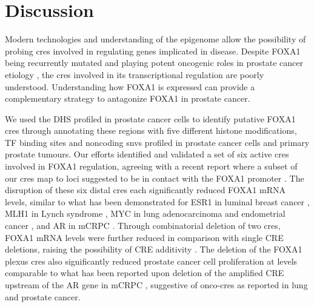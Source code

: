 \section{Discussion}

Modern technologies and understanding of the epigenome allow the possibility of probing \glspl{cre} involved in regulating genes implicated in disease.
Despite FOXA1 being recurrently mutated \cite{abeshouseMolecularTaxonomyPrimary2015,fraserGenomicHallmarksLocalized2017,barbieriExomeSequencingIdentifies2012,grassoMutationalLandscapeLethal2012,robinsonIntegrativeClinicalGenomics2015} and playing potent oncogenic roles in prostate cancer etiology \cite{paroliaDistinctStructuralClasses2019,adamsFOXA1MutationsAlter2019,gaoForkheadDomainMutations2019}, the \glspl{cre} involved in its transcriptional regulation are poorly understood.
Understanding how FOXA1 is expressed can provide a complementary strategy to antagonize FOXA1 in prostate cancer.

We used the DHS profiled in prostate cancer cells to identify putative FOXA1 \glspl{cre} through annotating these regions with five different histone modifications, TF binding sites and noncoding \glspl{snv} profiled in prostate cancer cells and primary prostate tumours.
Our efforts identified and validated a set of six active \glspl{cre} involved in FOXA1 regulation, agreeing with a recent report where a subset of our \glspl{cre} map to loci suggested to be in contact with the FOXA1 promoter \cite{rhieHighresolution3DEpigenomic2019}.
The disruption of these six distal \glspl{cre} each significantly reduced FOXA1 mRNA levels, similar to what has been demonstrated for ESR1 in luminal breast cancer \cite{baileyNoncodingSomaticInherited2016}, MLH1 in Lynch syndrome \cite{liuDisruption35Kb2018}, MYC in lung adenocarcinoma and endometrial cancer \cite{zhangIdentificationFocallyAmplified2016}, and AR in mCRPC \cite{takedaSomaticallyAcquiredEnhancer2018,viswanathanStructuralAlterationsDriving2018}.
Through combinatorial deletion of two \glspl{cre}, FOXA1 mRNA levels were further reduced in comparison with single CRE deletions, raising the possibility of CRE additivity \cite{osterwalderEnhancerRedundancyProvides2018}.
The deletion of the FOXA1 plexus \glspl{cre} also significantly reduced prostate cancer cell proliferation at levels comparable to what has been reported upon deletion of the amplified CRE upstream of the AR gene in mCRPC \cite{takedaSomaticallyAcquiredEnhancer2018}, suggestive of onco-\glspl{cre} as reported in lung \cite{zhangIdentificationFocallyAmplified2016} and prostate \cite{takedaSomaticallyAcquiredEnhancer2018} cancer.

